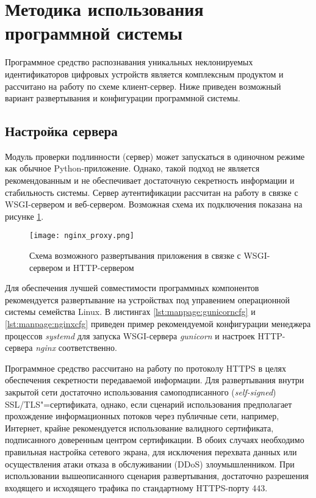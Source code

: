 \section{Методика использования программной системы}
\label{sec:manpage}

Программное средство распознавания уникальных неклонируемых идентификаторов цифровых устройств является комплексным продуктом и рассчитано на работу по схеме клиент-сервер. Ниже приведен возможный вариант развертывания и конфигурации программной системы.

\subsection{Настройка сервера}
\label{sec:manpage:server_setup}
Модуль проверки подлинности (сервер) может запускаться в одиночном режиме как обычное Python-приложение. Однако, такой подход не является рекомендованным и не обеспечивает достаточную секретность информации и стабильность системы. Сервер аутентификации рассчитан на работу в связке с WSGI-сервером и веб-сервером. Возможная схема их подключения показана на рисунке \ref{fig:manpage:nginx_proxy}.

\begin{figure}[!h]
    \centering
    \texttt{[image: nginx\_proxy.png]}
    \caption{Схема возможного развертывания приложения в связке с WSGI-сервером и HTTP-сервером}
    \label{fig:manpage:nginx_proxy}
\end{figure}


Для обеспечения лучшей совместимости программных компонентов рекомендуется развертывание на устройствах под управением операционной системы семейства Linux. В листингах \ref{lst:manpage:gunicorncfg} и \ref{lst:manpage:nginxcfg} приведен пример рекомендуемой конфигурации менеджера процессов \emph{systemd} для запуска WSGI-сервера \emph{gunicorn} и настроек HTTP-сервера \emph{nginx} соответственно.


Программное средство рассчитано на работу по протоколу HTTPS в целях обеспечения секретности передаваемой информации. Для развертывания внутри закрытой сети достаточно использования самоподписанного (\emph{self-signed}) SSL/TLS"=сертификата, однако, если сценарий использования предполагает прохождение информационных потоков через публичные сети, например, Интернет, крайне рекомендуется использование валидного сертификата, подписанного доверенным центром сертификации. В обоих случаях необходимо правильная настройка сетевого экрана, для исключения перехвата данных или осуществления атаки отказа в обслуживании (DDoS) злоумышленником. При использовании вышеописанного сценария развертывания, достаточно разрешения входящего и исходящего трафика по стандартному HTTPS-порту 443.


